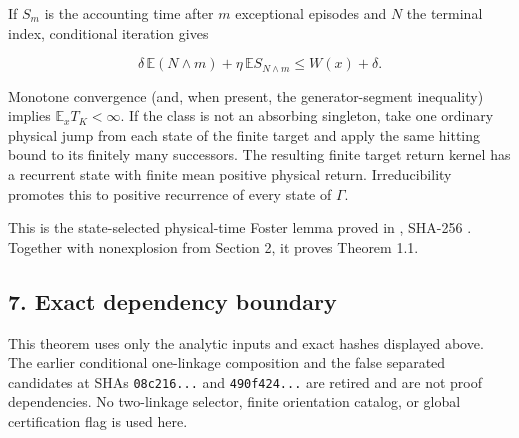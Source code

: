 If \(S_m\) is the accounting time after \(m\) exceptional episodes and
\(N\) the terminal index, conditional iteration gives

\[
 \delta\,\mathbb E(N\wedge m)
 +\eta\,\mathbb E S_{N\wedge m}\le W(x)+\delta.            \tag{6.1}
\]

Monotone convergence (and, when present, the generator-segment
inequality) implies \(\mathbb E_xT_K<\infty\). If the class is not an
absorbing singleton, take one ordinary physical jump from each state of
the finite target and apply the same hitting bound to its finitely many
successors. The resulting finite target return kernel has a recurrent
state with finite mean positive physical return. Irreducibility promotes
this to positive recurrence of every state of \(\Gamma\).

This is the state-selected physical-time Foster lemma proved in
\texttt{},
SHA-256
\texttt{}.
Together with nonexplosion from Section 2, it proves Theorem 1.1.

\subsection{7. Exact dependency
boundary}

This theorem uses only the analytic inputs and exact hashes displayed
above. The earlier conditional one-linkage composition and the false
separated candidates at SHAs \texttt{08c216...} and \texttt{490f424...}
are retired and are not proof dependencies. No two-linkage selector,
finite orientation catalog, or global certification flag is used here.
